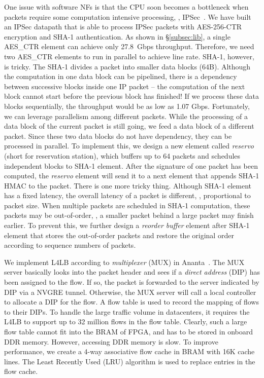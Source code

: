 One issue with software NFs is that the CPU soon becomes a bottleneck when packets require some
computation intensive processing, \eg, IPSec~\cite{packetshader}.
%
We have built an IPSec datapath that is able to process IPSec packets with AES-256-CTR encryption and SHA-1 authentication. 
As shown in \S\ref{subsec:lib}, a single AES\_CTR element can achieve only 27.8~Gbps throughput. Therefore, we need two
AES\_CTR elements to run in parallel to achieve line rate.
SHA-1, however, is tricky. The SHA-1 divides a packet into smaller data blocks (64B). 
Although the computation in one data block can be pipelined, 
there is a dependency between successive blocks inside one IP packet -- the computation of the next block cannot start before the previous
block has finished! 
If we process these data blocks sequentially, the throughput would be as low as 1.07 Gbps. 
Fortunately, we can leverage parallelism among different packets. 
While the processing of a data block of the current packet is still going, we feed a data block of a different packet. 
Since these two data blocks do not have dependency, they can be processed in parallel. 
To implement this, we design a new element called \textit{reservo} (short for reservation station), which buffers up to 64 packets and schedules 
independent blocks to SHA-1 element. After the signature of one packet has been computed, the \textit{reservo} element will 
send it to a next element that appends SHA-1 HMAC to the packet.
%
There is one more tricky thing. 
Although SHA-1 element has a fixed latency, the overall latency of a packet is different, \ie, proportional to packet size. 
When multiple packets are scheduled in SHA-1 computation, these packets may be
out-of-order, \eg, a smaller packet behind a large packet may finish earlier.
%
To prevent this, we further design a \textit{reorder buffer} element after SHA-1 element
that stores the out-of-order packets and restore the original order
 according to sequence numbers of packets. 

 We implement L4LB according to \textit{multiplexer} (MUX) in Ananta~\cite{ananta}.
%
The MUX server basically looks into the packet header and sees if a \textit{direct address} (DIP) has been assigned to the flow.
If so, the packet is forwarded to the server indicated by DIP via a NVGRE tunnel. Otherwise, the MUX server will call a local controller to
allocate a DIP for the flow.
%
%
A flow table is used to record the mapping of flows to their DIPs.
%
To handle the large traffic volume in datacenters, it requires the L4LB to support up to 32 million flows in the flow table.
Clearly, such a large flow table cannot fit into the BRAM of FPGA, and has to be stored in onboard DDR memory.
However, accessing DDR memory is slow. 
To improve performance, we create a 4-way associative flow cache in BRAM with 16K 
cache lines. The Least Recently Used (LRU) algorithm is used to replace entries 
in the flow cache.

